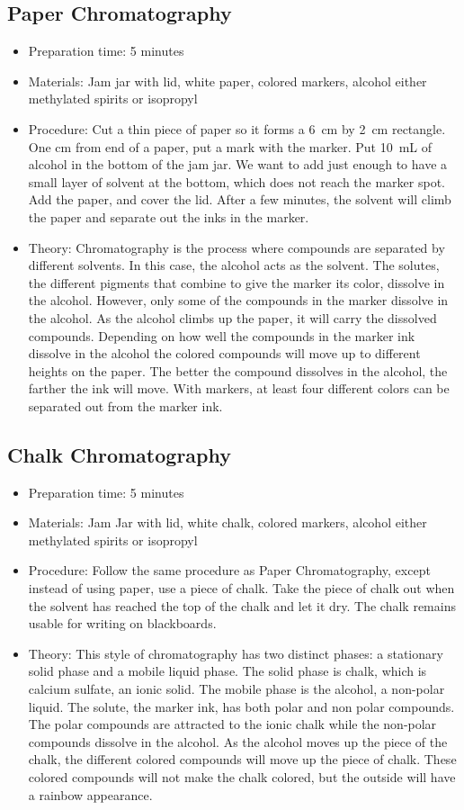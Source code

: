 \subsection{Paper Chromatography}
\begin{itemize}
\item{Preparation time: 5 minutes}
\item{Materials: Jam jar with lid, white paper, colored markers, alcohol either methylated spirits or isopropyl}
\item{Procedure: Cut a thin piece of paper so it forms a 6~cm by 2~cm rectangle. One cm from end of a paper, put a mark with the marker. Put 10~mL of alcohol in the bottom of the jam jar. We want to add just enough to have a small layer of solvent at the bottom, which does not reach the marker spot. Add the paper, and cover the lid. After a few minutes, the solvent will climb the paper and separate out the inks in the marker.}
\item{Theory: Chromatography is the process where compounds are separated by different solvents. In this case, the alcohol acts as the solvent. The solutes, the different pigments that combine to give the marker its color, dissolve in the alcohol. However, only some of the compounds in the marker dissolve in the alcohol. As the alcohol climbs up the paper, it will carry the dissolved compounds. Depending on how well the compounds in the marker ink dissolve in the alcohol the colored compounds will move up to different heights on the paper. The better the compound dissolves in the alcohol, the farther the ink will move. With markers, at least four different colors can be separated out from the marker ink.}
\end{itemize}

\subsection{Chalk Chromatography}
\begin{itemize}
\item{Preparation time: 5 minutes}
\item{Materials: Jam Jar with lid, white chalk, colored markers, alcohol either methylated spirits or isopropyl}
\item{Procedure: Follow the same procedure as Paper Chromatography, except instead of using paper, use a piece of chalk. Take the piece of chalk out when the solvent has reached the top of the chalk and let it dry. The chalk remains usable for writing on blackboards.}
\item{Theory: This style of chromatography has two distinct phases: a stationary solid phase and a mobile liquid phase. The solid phase is chalk, which is calcium sulfate, an ionic solid. The mobile phase is the alcohol, a non-polar liquid. The solute, the marker ink, has both polar and non polar compounds. The polar compounds are attracted to the ionic chalk while the non-polar compounds dissolve in the alcohol. As the alcohol moves up the piece of the chalk, the different colored compounds will move up the piece of chalk. These colored compounds will not make the chalk colored, but the outside will have a rainbow appearance.}
\end{itemize}

